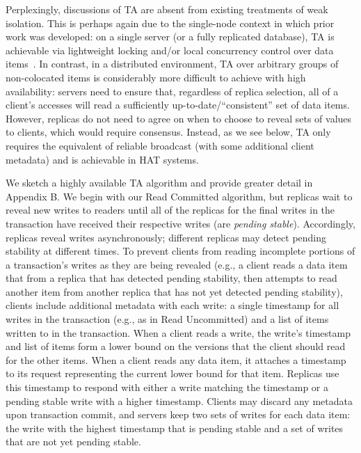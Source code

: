 Perplexingly, discussions of TA are absent from existing treatments of
weak isolation. This is perhaps again due to the single-node context
in which prior work was developed: on a single server (or a fully
replicated database), TA is achievable via lightweight locking and/or
local concurrency control over data items~\cite{gstore}. In contrast,
in a distributed environment, TA over arbitrary groups of
non-colocated items is considerably more difficult to achieve with
high availability: servers need to ensure that, regardless of replica
selection, all of a client's accesses will read a sufficiently
up-to-date/``consistent'' set of data items. However, replicas do not
need to agree on when to choose to reveal sets of values to clients, which would require consensus. Instead, as we see below, TA
only requires the equivalent of reliable broadcast (with some
additional client metadata) and is achievable in HAT systems.


We sketch a highly available TA algorithm and provide greater detail
in Appendix B.
We begin with our Read Committed algorithm, but replicas wait to reveal new writes to readers
until all of the replicas for the final writes in the transaction have
received their respective writes (are \textit{pending
  stable}). Accordingly, replicas reveal writes asynchronously;
different replicas may detect pending stability at different times. To
prevent clients from reading incomplete portions of a transaction's
writes as they are being revealed (e.g., a client reads a data item
that from a replica that has detected pending stability, then attempts
to read another item from another replica that has not yet detected
pending stability), clients include additional metadata with each
write: a single timestamp for all writes in the transaction (e.g., as
in Read Uncommitted) and a list of items written to in the
transaction. When a client reads a write, the write's timestamp and
list of items form a lower bound on the versions that the client
should read for the other items. When a client reads any data item, it
attaches a timestamp to its request representing the current lower
bound for that item. Replicas use this timestamp to respond with
either a write matching the timestamp or a pending stable write with a
higher timestamp. Clients may discard any metadata upon transaction
commit, and servers keep two sets of writes for each data item: the
write with the highest timestamp that is pending stable and a set of
writes that are not yet pending stable.

